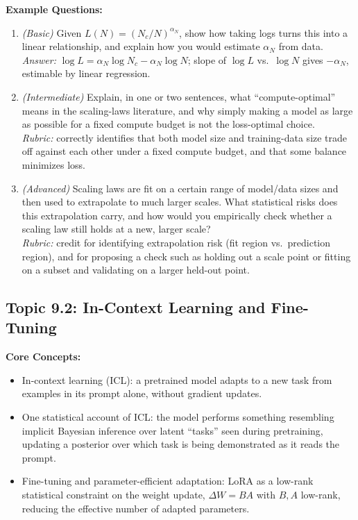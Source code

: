 \documentclass[11pt]{article}
\begin{document}
\textbf{Example Questions:}
\begin{enumerate}
  \item \textit{(Basic)} Given $L(N) = (N_c/N)^{\alpha_N}$, show how taking logs turns this into a linear relationship, and explain how you would estimate $\alpha_N$ from data. \\
  \textit{Answer:} $\log L = \alpha_N \log N_c - \alpha_N \log N$; slope of $\log L$ vs.\ $\log N$ gives $-\alpha_N$, estimable by linear regression.
  \item \textit{(Intermediate)} Explain, in one or two sentences, what ``compute-optimal'' means in the scaling-laws literature, and why simply making a model as large as possible for a fixed compute budget is not the loss-optimal choice. \\
  \textit{Rubric:} correctly identifies that both model size and training-data size trade off against each other under a fixed compute budget, and that some balance minimizes loss.
  \item \textit{(Advanced)} Scaling laws are fit on a certain range of model/data sizes and then used to extrapolate to much larger scales. What statistical risks does this extrapolation carry, and how would you empirically check whether a scaling law still holds at a new, larger scale? \\
  \textit{Rubric:} credit for identifying extrapolation risk (fit region vs.\ prediction region), and for proposing a check such as holding out a scale point or fitting on a subset and validating on a larger held-out point.
\end{enumerate}

\subsection{Topic 9.2: In-Context Learning and Fine-Tuning}

\textbf{Core Concepts:}
\begin{itemize}
  \item In-context learning (ICL): a pretrained model adapts to a new task from examples in its prompt alone, without gradient updates.
  \item One statistical account of ICL: the model performs something resembling implicit Bayesian inference over latent ``tasks'' seen during pretraining, updating a posterior over which task is being demonstrated as it reads the prompt.
  \item Fine-tuning and parameter-efficient adaptation: LoRA as a low-rank statistical constraint on the weight update, $\Delta W = BA$ with $B,A$ low-rank, reducing the effective number of adapted parameters.
\end{itemize}
\end{document}
